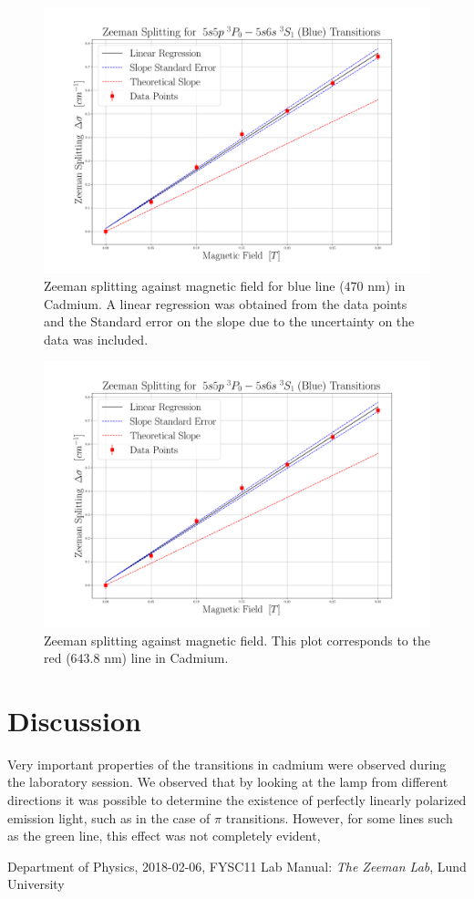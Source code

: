 \documentclass[12pt]{article}
\begin{document}
\begin{figure}[H]
    \centering
    \includegraphics[width=1 \textwidth]{BlueSlope.png}
    \caption{ Zeeman splitting against magnetic field for blue line ($470$ nm) in Cadmium. A linear regression was obtained from the data points and the Standard error on the slope due to the uncertainty on the data was included.}
\end{figure}

\begin{figure}[H]
    \centering
    \includegraphics[width=1\textwidth]{BlueSlope.png}
    \caption{Zeeman splitting against magnetic field. This plot corresponds to the red ($643.8$ nm)  line in Cadmium.}
\end{figure}

\section{Discussion}
Very important properties of the transitions in cadmium were observed during the laboratory session. We observed that by looking at the lamp from different directions it was possible  to determine the existence of perfectly linearly polarized emission light, such as in the case of $\pi$ transitions. However, for some lines such as the green line, this effect was not completely evident,

\begin{thebibliography}{99}
Department of Physics, 2018-02-06, FYSC11 Lab Manual: \textit{The Zeeman Lab}, Lund University

\end{thebibliography}
\end{document}
